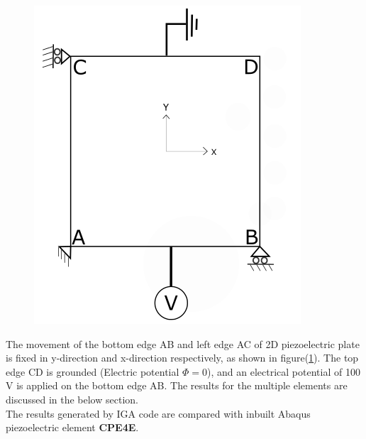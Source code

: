 \documentclass[12pt]{article}
\begin{document}
\begin{figure}[H]
\begin{minipage}{.4\textwidth}
		\includegraphics[width=1\linewidth]{PureElectrical.png}
		\label{PureElectrical}
	\end{minipage}
\end{figure}
The movement of the bottom edge AB and left edge AC of 2D piezoelectric plate is fixed in y-direction and x-direction respectively, as shown in figure(\ref{PureElectrical}).
The top edge CD is grounded (Electric potential $\Phi = 0$), and an electrical potential of 100 V  is applied on the bottom edge AB. The results for the multiple elements are discussed in the below
section. \\
The results generated by IGA code are compared with inbuilt Abaqus piezoelectric
element \textbf{CPE4E}.

\newpage
\end{document}
